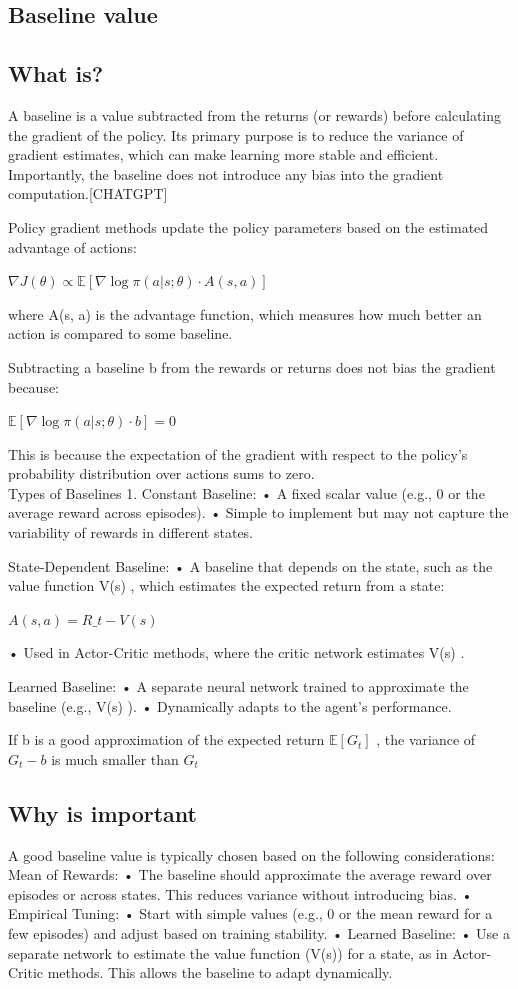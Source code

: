 \documentclass{article}
\begin{document}
\subsection{Baseline value}
\subsection{What is?}
A baseline is a value subtracted from the returns (or rewards) before calculating the gradient of the policy. Its primary purpose is to reduce the variance of gradient estimates, which can make learning more stable and efficient. Importantly, the baseline does not introduce any bias into the gradient computation.[CHATGPT]

Policy gradient methods update the policy parameters based on the estimated advantage of actions:

$\nabla J(\theta) \propto \mathbb{E}[\nabla \log \pi(a|s; \theta) \cdot A(s, a)]$

where  A(s, a)  is the advantage function, which measures how much better an action is compared to some baseline.

Subtracting a baseline  b  from the rewards or returns does not bias the gradient because:

$\mathbb{E}[\nabla \log \pi(a|s; \theta) \cdot b] = 0$

This is because the expectation of the gradient with respect to the policy’s probability distribution over actions sums to zero.\\

Types of Baselines
1.	Constant Baseline:
•	A fixed scalar value (e.g., 0 or the average reward across episodes).
•	Simple to implement but may not capture the variability of rewards in different states.

State-Dependent Baseline:
•	A baseline that depends on the state, such as the value function  V(s) , which estimates the expected return from a state:

$A(s, a) = R\_t - V(s)$

•	Used in Actor-Critic methods, where the critic network estimates  V(s) .

Learned Baseline:
•	A separate neural network trained to approximate the baseline (e.g.,  V(s) ).
•	Dynamically adapts to the agent’s performance.

If  b  is a good approximation of the expected return  $\mathbb{E}[G_t]$ , the variance of  $G_t - b$  is much smaller than  $G_t $

\subsection{Why is important}
A good baseline value is typically chosen based on the following considerations:
Mean of Rewards:
•	The baseline should approximate the average reward over episodes or across states. This reduces variance without introducing bias.
•	Empirical Tuning:
•	Start with simple values (e.g., 0 or the mean reward for a few episodes) and adjust based on training stability.
•	Learned Baseline:
•	Use a separate network to estimate the value function (V(s)) for a state, as in Actor-Critic methods. This allows the baseline to adapt dynamically.
\end{document}
